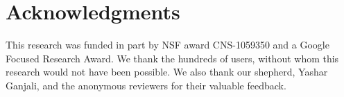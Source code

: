 \section*{Acknowledgments}\label{sec:acknowledgments}
\noindent
This research was funded in part by NSF award CNS-1059350 and a Google Focused
Research Award. We thank the hundreds of \name{} users, without whom this
research would not have been possible. We also thank our shepherd, Yashar
Ganjali, and the anonymous reviewers for their valuable feedback.
